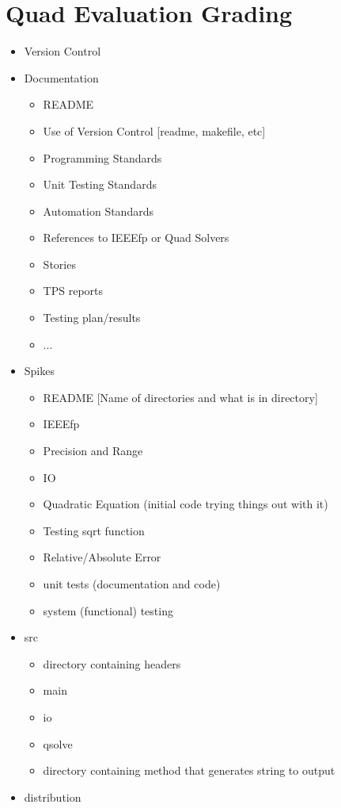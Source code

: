 \documentclass{report}
\begin{document}
\section{Quad Evaluation Grading}
\begin{itemize}
\item Version Control
\item Documentation
	\begin{itemize}
	\item README
	\item Use of Version Control [readme, makefile, etc]
	\item Programming Standards
	\item Unit Testing Standards
	\item Automation Standards
	\item References to IEEEfp or Quad Solvers
	\item Stories
	\item TPS reports
	\item Testing plan/results
	\item ...
	\end{itemize}
\item Spikes
	\begin{itemize}
	\item README [Name of directories and what is in directory]
	\item IEEEfp
	\item Precision and Range
	\item IO
	\item Quadratic Equation (initial code trying things out with it)
	\item Testing sqrt function
	\item Relative/Absolute Error
	\item unit tests (documentation and code)
	\item system (functional) testing
	\end{itemize}
\item src
	\begin{itemize}
	\item directory containing headers
	\item main
	\item io
	\item qsolve
	\item directory containing method that generates string to output
	\end{itemize}
\item distribution
	\begin{itemize}

\end{itemize}
\end{itemize}
\end{document}
